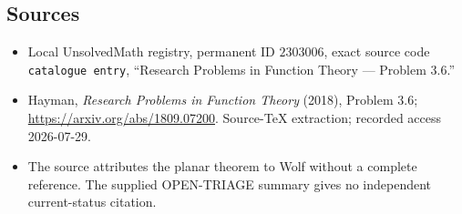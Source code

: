 \documentclass[11pt]{article}
\begin{document}
\subsection{Sources}
\begin{itemize}
\item Local UnsolvedMath registry, permanent ID \(2303006\), exact source code \texttt{catalogue entry}, ``Research Problems in Function Theory --- Problem 3.6.''
\item Hayman, \emph{Research Problems in Function Theory} (2018), Problem 3.6; \url{https://arxiv.org/abs/1809.07200}. Source-TeX extraction; recorded access 2026-07-29.
\item The source attributes the planar theorem to Wolf without a complete reference. The supplied OPEN-TRIAGE summary gives no independent current-status citation.
\end{itemize}
\end{document}
